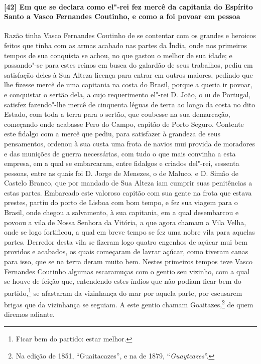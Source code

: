 \paragraph{[42] Em que se declara como el"-rei fez mercê da capitania do Espírito Santo a
Vasco Fernandes Coutinho, e como a foi povoar em pessoa} \quad
Razão tinha Vasco Fernandes Coutinho de se contentar com os grandes e heroicos feitos que
tinha com as armas acabado nas partes da Índia, onde nos primeiros tempos de sua conquista
se achou, no que gastou o melhor de sua idade; e passando"-se para estes reinos em busca do
galardão de seus trabalhos, pediu em satisfação deles à Sua Alteza licença para entrar em
outros maiores, pedindo que lhe fizesse mercê de uma capitania na costa do Brasil, porque
a queria ir povoar, e conquistar o sertão dela, a cujo requerimento el"-rei D. João, o
\textsc{iii} de Portugal, satisfez fazendo"-lhe mercê de cinquenta léguas de terra ao longo
da costa no dito Estado, com toda a terra para o sertão, que coubesse na sua demarcação,
começando onde acabasse Pero do Campo, capitão de Porto Seguro. Contente este fidalgo com
a mercê que pediu, para satisfazer à grandeza de seus pensamentos, ordenou à sua custa uma
frota de navios mui provida de moradores e das munições de guerra necessárias, com tudo o
que mais convinha a esta empresa, em a qual se embarcaram, entre fidalgos e criados
del"-rei, sessenta pessoas, entre as quais foi D. Jorge de Menezes, o de Maluco, e D. Simão
de Castelo Branco, que por mandado de Sua Alteza iam cumprir suas penitências a estas
partes. Embarcado este valoroso capitão com sua gente na frota que estava prestes, partiu
do porto de Lisboa com bom tempo, e fez sua viagem para o Brasil, onde chegou a
salvamento, à sua capitania, em a qual desembarcou e povoou a vila de Nossa Senhora da
Vitória, a que agora chamam a Vila Velha, onde se logo fortificou, a qual em breve tempo
se fez uma nobre vila para aquelas partes. Derredor desta vila se fizeram logo quatro
engenhos de açúcar mui bem providos e acabados, os quais começaram de lavrar açúcar, como
tiveram canas para isso, que se na terra deram muito bem. Nestes primeiros tempos teve
Vasco Fernandes Coutinho algumas escaramuças com o gentio seu vizinho, com a qual se houve
de feição que, entendendo estes índios que não podiam ficar bem do partido,\footnote{ Ficar
bem do partido: estar melhor.} se afastaram da vizinhança do mar por aquela parte, por
escusarem brigas que da vizinhança se seguiam. A este gentio chamam Goaitazes,\footnote{ Na
edição de 1851, ``Guaitacazes'', e na de 1879, ``\textit{Guaytcazes}''.} de quem diremos
adiante.

